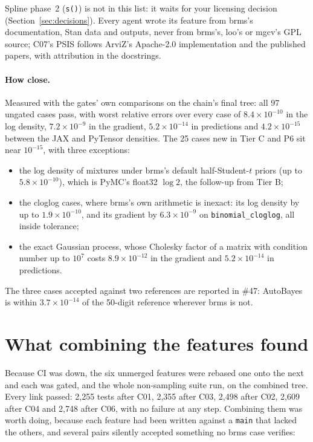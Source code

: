 \documentclass[11pt]{article}
\newcommand{\code}[1]{\texttt{#1}}
\begin{document}
\noindent Spline phase~2 (\code{s()}) is not in this list: it waits for your licensing decision (Section~\ref{sec:decisions}).
Every agent wrote its feature from brms's documentation, Stan data and outputs, never from brms's, loo's or mgcv's
GPL source; C07's PSIS follows ArviZ's Apache-2.0 implementation and the published papers, with attribution in the
docstrings.

\paragraph{How close.} Measured with the gates' own comparisons on the chain's final tree: all 97 ungated cases pass,
with worst relative errors over every case of $8.4\times10^{-10}$ in the log density, $7.2\times10^{-9}$ in the gradient,
$5.2\times10^{-14}$ in predictions and $4.2\times10^{-15}$ between the JAX and PyTensor densities. The 25 cases new in
Tier C and P6 sit near $10^{-15}$, with three exceptions:
\begin{itemize}
\item the log density of mixtures under brms's default half-Student-$t$ priors (up to $5.8\times10^{-10}$), which is
  PyMC's float32 $\log 2$, the follow-up from Tier B;
\item the cloglog cases, where brms's own arithmetic is inexact: its log density by up to $1.9\times10^{-10}$, and its
  gradient by $6.3\times10^{-9}$ on \code{binomial\_cloglog}, all inside tolerance;
\item the exact Gaussian process, whose Cholesky factor of a matrix with condition number up to $10^{7}$ costs
  $8.9\times10^{-12}$ in the gradient and $5.2\times10^{-14}$ in predictions.
\end{itemize}
\noindent The three cases accepted against two references are reported in \#47: AutoBayes is within $3.7\times10^{-14}$ of
the 50-digit reference wherever brms is not.

\section{What combining the features found}
\label{sec:integration}

Because CI was down, the six unmerged features were rebased one onto the next and each was gated, and the whole
non-sampling suite run, on the combined tree. Every link passed: 2{,}255 tests after C01, 2{,}355 after C03, 2{,}498 after
C02, 2{,}609 after C04 and 2{,}748 after C06, with no failure at any step. Combining them was worth doing, because each
feature had been written against a \code{main} that lacked the others, and several pairs silently accepted something no
brms case verifies:
\end{document}
